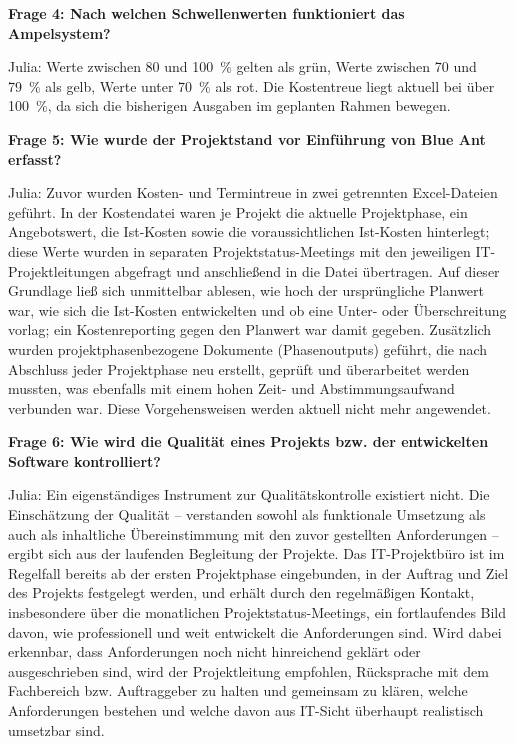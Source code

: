 \documentclass[
    12pt, 
    a4paper,
    ]{scrartcl} %
\begin{document}
\textbf{Frage 4: Nach welchen Schwellenwerten funktioniert das Ampelsystem?}

Julia: Werte zwischen 80 und 100~\% gelten als grün, Werte zwischen 70 und 79~\% als gelb, Werte unter 70~\% als rot. Die Kostentreue liegt aktuell bei über 100~\%, da sich die bisherigen Ausgaben im geplanten Rahmen bewegen.

\bigskip
{}

\textbf{Frage 5: Wie wurde der Projektstand vor Einführung von Blue Ant erfasst?}

Julia: Zuvor wurden Kosten- und Termintreue in zwei getrennten Excel-Dateien geführt. In der Kostendatei waren je Projekt die aktuelle Projektphase, ein Angebotswert, die Ist-Kosten sowie die voraussichtlichen Ist-Kosten hinterlegt; diese Werte wurden in separaten Projektstatus-Meetings mit den jeweiligen IT-Projektleitungen abgefragt und anschließend in die Datei übertragen. Auf dieser Grundlage ließ sich unmittelbar ablesen, wie hoch der ursprüngliche Planwert war, wie sich die Ist-Kosten entwickelten und ob eine Unter- oder Überschreitung vorlag; ein Kostenreporting gegen den Planwert war damit gegeben. Zusätzlich wurden projektphasenbezogene Dokumente (Phasenoutputs) geführt, die nach Abschluss jeder Projektphase neu erstellt, geprüft und überarbeitet werden mussten, was ebenfalls mit einem hohen Zeit- und Abstimmungsaufwand verbunden war. Diese Vorgehensweisen werden aktuell nicht mehr angewendet.

\bigskip
{}

\textbf{Frage 6: Wie wird die Qualität eines Projekts bzw. der entwickelten Software kontrolliert?}

Julia: Ein eigenständiges Instrument zur Qualitätskontrolle existiert nicht. Die Einschätzung der Qualität -- verstanden sowohl als funktionale Umsetzung als auch als inhaltliche Übereinstimmung mit den zuvor gestellten Anforderungen -- ergibt sich aus der laufenden Begleitung der Projekte. Das IT-Projektbüro ist im Regelfall bereits ab der ersten Projektphase eingebunden, in der Auftrag und Ziel des Projekts festgelegt werden, und erhält durch den regelmäßigen Kontakt, insbesondere über die monatlichen Projektstatus-Meetings, ein fortlaufendes Bild davon, wie professionell und weit entwickelt die Anforderungen sind. Wird dabei erkennbar, dass Anforderungen noch nicht hinreichend geklärt oder ausgeschrieben sind, wird der Projektleitung empfohlen, Rücksprache mit dem Fachbereich bzw. Auftraggeber zu halten und gemeinsam zu klären, welche Anforderungen bestehen und welche davon aus IT-Sicht überhaupt realistisch umsetzbar sind.
\end{document}
